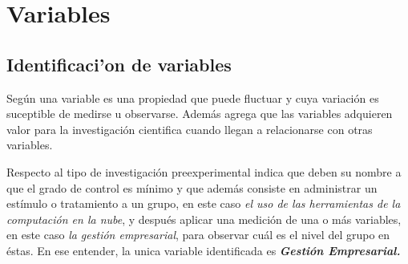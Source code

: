 \section{Variables}

\subsection{Identificaci'on de variables}
Seg\'un \cite{sampieri} una variable es una propiedad que puede fluctuar y cuya
variaci\'on es suceptible de medirse u observarse. Adem\'as agrega que las variables
adquieren valor para la investigaci\'on cientifica cuando llegan a relacionarse
con otras variables.

Respecto al tipo de investigaci\'on preexperimental \cite{sampieri} indica que deben
su nombre a que el grado de control es m\'inimo y que adem\'as consiste en administrar
un est\'imulo o tratamiento a un grupo, en este caso \emph{el uso de las herramientas
de la computaci\'on en la nube}, y despu\'es aplicar una medici\'on de una o m\'as
variables, en este caso \emph{la gesti\'on empresarial}, para observar cu\'al es
el nivel del grupo  en \'estas. En ese entender, la unica variable identificada es
\emph{\textbf{Gesti\'on Empresarial.}}
